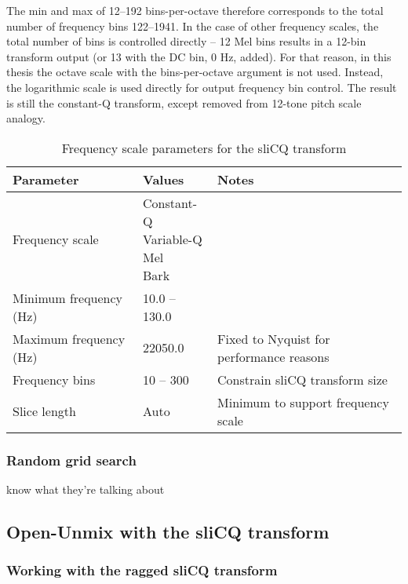 \documentclass[report.tex]{subfiles}
\begin{document}
The min and max of 12--192 bins-per-octave therefore corresponds to the total number of frequency bins 122--1941. In the case of other frequency scales, the total number of bins is controlled directly -- 12 Mel bins results in a 12-bin transform output (or 13 with the DC bin, 0 Hz, added). For that reason, in this thesis the octave scale with the bins-per-octave argument is not used. Instead, the logarithmic scale is used directly for output frequency bin control. The result is still the constant-Q transform, except removed from 12-tone pitch scale analogy.

\begin{table}[ht]
	\centering
\begin{tabular}{ |l|l|l| }
	 \hline
	 Parameter & Values & Notes \\
	 \hline
	 \hline
	 Frequency scale & \makecell[l]{ Constant-Q \\ Variable-Q \\ Mel \\ Bark } & \\
	 \hline
	 Minimum frequency (Hz) & 10.0 -- 130.0 & \\
	 \hline
	 Maximum frequency (Hz) & 22050.0 & Fixed to Nyquist for performance reasons \\
	 \hline
	 Frequency bins & 10 -- 300 & Constrain sliCQ transform size \\
	 \hline
	 Slice length & Auto & Minimum to support frequency scale \\
	 \hline
\end{tabular}
	\caption{Frequency scale parameters for the sliCQ transform}
	\label{table:slicqfreqparam}
\end{table}

\subsubsection{Random grid search}

\textcite{randomgrid} know what they're talking about

\subsection{Open-Unmix with the sliCQ transform}



\subsubsection{Working with the ragged sliCQ transform}
\end{document}
